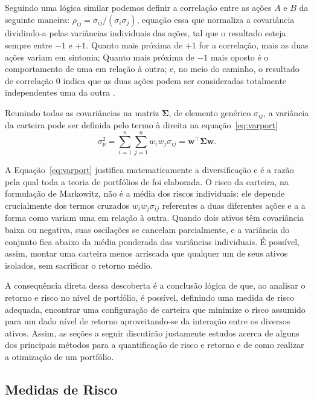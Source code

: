 \documentclass[12pt,a4paper]{article}
\begin{document}
Seguindo uma lógica similar podemos definir a correlação entre as ações $A$ e $B$ da seguinte maneira: $\rho_{ij} = \sigma_{ij} / (\sigma_i \sigma_j)$, equação essa que normaliza a covariância dividindo-a pelas variâncias individuais das ações, tal que o resultado esteja sempre entre $-1$ e $+1$. Quanto mais próxima de $+1$ for a correlação, mais as duas ações variam em sintonia; Quanto mais próxima de $-1$ mais oposto é o comportamento de uma em relação à outra; e, no meio do caminho, o resultado de correlação $0$ indica que as duas ações podem ser consideradas totalmente independentes uma da outra \cite{markowitz1952portfolio}. 

Reunindo todas as covariâncias na matriz $\boldsymbol{\Sigma}$, de elemento genérico $\sigma_{ij}$, a variância da carteira pode ser definida pelo termo à direita na equação~\eqref{eq:varport}
\begin{equation}
\sigma_p^2 = \sum_{i=1}^{n}\sum_{j=1}^{n} w_i w_j \sigma_{ij} = \mathbf{w}^\top \boldsymbol{\Sigma} \mathbf{w}.
\label{eq:varport}
\end{equation}

A Equação~\eqref{eq:varport} justifica matematicamente a diversificação e é a razão pela qual toda a teoria de portfólios de  foi elaborada. O risco da carteira, na formulação de Markowitz, não é a média dos riscos individuais: ele depende crucialmente dos termos cruzados $w_i w_j \sigma_{ij}$ referentes a duas diferentes ações e a a forma como variam uma em relação à outra. Quando dois ativos têm covariância baixa ou negativa, suas oscilações se cancelam parcialmente, e a variância do conjunto fica abaixo da média ponderada das variâncias individuais. É possível, assim, montar uma carteira menos arriscada que qualquer um de seus ativos isolados, sem sacrificar o retorno médio. 

A consequência direta dessa descoberta é a conclusão lógica de que, ao analisar o retorno e risco no nível de portfólio, é possível, definindo uma medida de risco adequada, encontrar uma configuração de carteira que minimize o risco assumido para um dado nível de retorno aproveitando-se da interação entre os diversos ativos. Assim, as seções a seguir discutirão justamente estudos acerca de alguns dos principais métodos para a quantificação de risco e retorno e de como realizar a otimização de um portfólio.

\subsection{Medidas de Risco}
\end{document}
